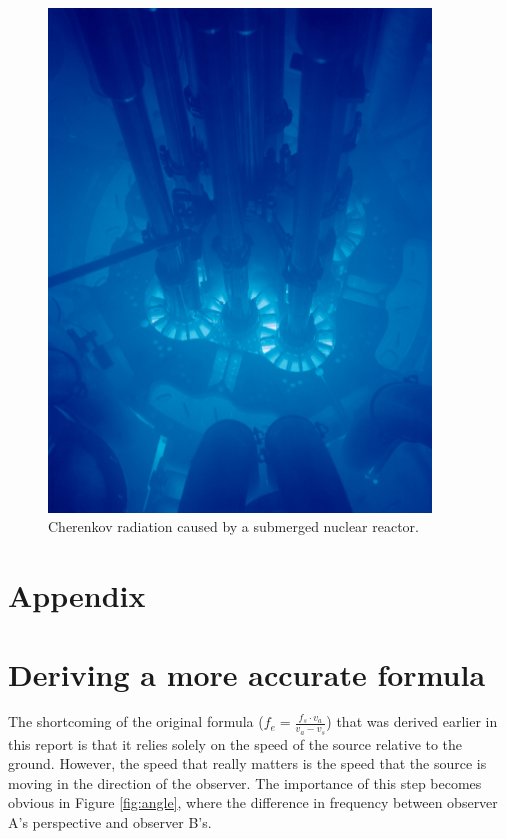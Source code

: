 \documentclass[12pt]{article}
\begin{document}
\begin{figure}[H]
	\centering
	\includegraphics[width=4in]{reactor}
	\caption{Cherenkov radiation caused by a submerged nuclear reactor.}
	\label{fig:reactor}
\end{figure}

\section*{Appendix}

\appendix

\section{Deriving a more accurate formula}

The shortcoming of the original formula ($ f_e = \frac{f_s \cdot v_a}{ v_a - v_s }$) that was derived earlier in this report is that it relies solely on the speed of the source relative to the ground.  However, the speed that really matters  is the speed that the source is moving in the direction of the observer. The importance of this step becomes obvious in Figure \ref{fig:angle}, where the difference in frequency between observer A's perspective  and observer B's. 
\end{document}
